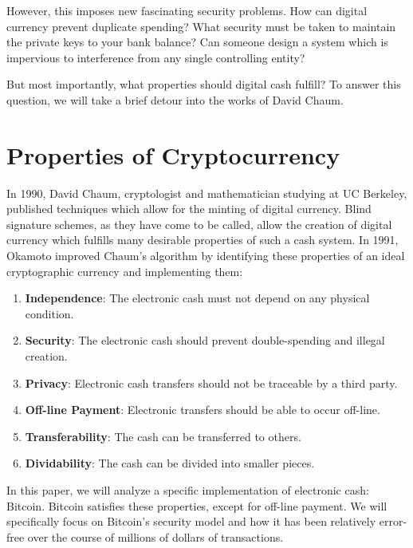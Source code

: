 \documentclass{report}
\begin{document}
However, this imposes new fascinating security problems. How can digital
currency prevent duplicate spending? What security must be taken to maintain the
private keys to your bank balance? Can someone design a system which is
impervious to interference from any single controlling entity?

But most importantly, what properties should digital cash fulfill? To answer
this question, we will take a brief detour into the works of David Chaum.

\section*{Properties of Cryptocurrency}
In 1990, David Chaum, cryptologist and mathematician studying at UC Berkeley,
published techniques which allow for the minting of digital
currency.\cite{Chaum:Cash} Blind signature schemes, as they have come to be
called, allow the creation of digital currency which fulfills many desirable
properties of such a cash system. In 1991, Okamoto improved Chaum's algorithm
by identifying these properties of an ideal cryptographic currency and
implementing them:\cite{Okamoto:Cash}

\begin{enumerate}
\item \textbf{Independence}: The electronic cash must not depend on any physical condition.
\item \textbf{Security}: The electronic cash should prevent double-spending and illegal creation.
\item \textbf{Privacy}: Electronic cash transfers should not be traceable by a third party.
\item \textbf{Off-line Payment}: Electronic transfers should be able to occur off-line.
\item \textbf{Transferability}: The cash can be transferred to others.
\item \textbf{Dividability}: The cash can be divided into smaller pieces.
\end{enumerate}

In this paper, we will analyze a specific implementation of electronic cash:
Bitcoin. Bitcoin satisfies these properties, except for off-line payment. We
will specifically focus on Bitcoin's security model and how it has been
relatively error-free over the course of millions of dollars of transactions.
\end{document}
